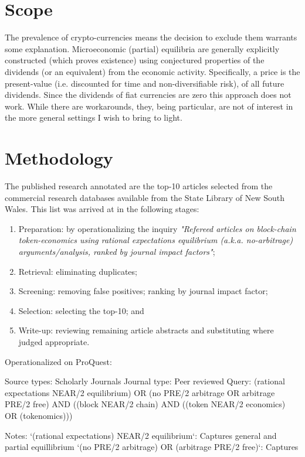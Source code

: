 \documentclass[11pt]{article}
\begin{document}
\section{Scope}
The prevalence of crypto-currencies means the decision to exclude them warrants some explanation. Microeconomic (partial) equilibria are generally explicitly constructed (which proves existence) using conjectured properties of the dividends (or an equivalent) from the economic activity. Specifically, a price is the present-value (i.e. discounted for time and non-diversifiable risk), of all future dividends. Since the dividends of fiat currencies are zero this approach does not work. While there are workarounds, they, being particular, are not of interest in the more general settings I wish to bring to light.

\section{Methodology}
The published research annotated are the top-10 articles selected from the commercial research databases available from the State Library of New South Wales. This list was arrived at in the following stages:
\begin{enumerate}
    \item Preparation:
    by operationalizing the inquiry \textit{"Refereed articles on block-chain token-economics using rational expectations equilibrium (a.k.a. no-arbitrage) arguments/analysis, ranked by journal impact factors"};
    \item Retrieval:
    eliminating duplicates;
    \item Screening:
    removing false positives;
    ranking by journal impact factor;
    \item Selection:
    selecting the top-10; and
    \item Write-up:
    reviewing remaining article abstracts and substituting where judged appropriate.
\end{enumerate}

Operationalized on ProQuest:

Source types: Scholarly Journals
Journal type: Peer reviewed
Query: (rational expectations NEAR/2 equilibrium) OR (no PRE/2 arbitrage OR arbitrage PRE/2 free) AND ((block NEAR/2 chain) AND ((token NEAR/2 economics) OR (tokenomics)))

Notes:
`(rational expectations) NEAR/2 equilibrium`: Captures general and partial equillibrium
`(no PRE/2 arbitrage) OR (arbitrage PRE/2 free)`: Captures 
\end{document}
